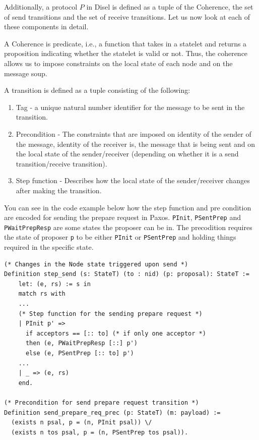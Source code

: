 Additionally, a protocol $P$ in Disel is defined as a tuple
of the \textsf{Coherence}, the set of send transitions and the set of receive transitions.
Let us now look at each of these components in detail.

A \textsf{Coherence} is predicate, i.e., a function that takes in a statelet and returns a proposition
indicating whether the statelet is valid or not. Thus, the coherence allows us
to impose constraints on the local state of each node and on the message soup.

A transition is defined as a tuple consisting of the following:
\begin{enumerate}
  \item Tag - a unique natural number identifier for the message to be sent in the transition.
  \item Precondition - The constraints that are imposed on identity of the sender of the message,
    identity of the receiver is, the message that is being sent and on the local state of
    the sender/receiver (depending on whether it is a send transition/receive transition).
  \item Step function - Describes how the local state of the sender/receiver changes after
    making the transition.
\end{enumerate}

You can see in the code example below how the step function and pre condition
are encoded for sending the \textsf{prepare request} in Paxos. \texttt{PInit},
\texttt{PSentPrep} and \texttt{PWaitPrepResp} are some states the
proposer can be in. The precodition requires the state of proposer \texttt{p}
to be either \texttt{PInit} or \texttt{PSentPrep} and holding things required
in the specific state.

\begin{lstlisting}
(* Changes in the Node state triggered upon send *)
Definition step_send (s: StateT) (to : nid) (p: proposal): StateT :=
    let: (e, rs) := s in
    match rs with
    ...
    (* Step function for the sending prepare request *)
    | PInit p' =>
      if acceptors == [:: to] (* if only one acceptor *)
      then (e, PWaitPrepResp [::] p')
      else (e, PSentPrep [:: to] p')
    ...
    | _ => (e, rs)
    end.

(* Precondition for send prepare request transition *)
Definition send_prepare_req_prec (p: StateT) (m: payload) :=
  (exists n psal, p = (n, PInit psal)) \/
  (exists n tos psal, p = (n, PSentPrep tos psal)).
\end{lstlisting}

